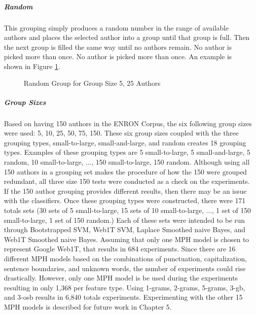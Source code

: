 		\subparagraph{Random} This grouping simply produces a random number in the range of available authors and places the selected author into a group until that group is full.  Then the next group is filled the same way until no authors remain.  No author is picked more than once. No author is picked more than once. An example is shown in Figure \ref{fig:randomGrouping}.
		\begin{figure}[ht!]
			\begin{center}
				\caption{Random Group for Group Size 5, 25 Authors}
				\label{fig:randomGrouping}
			\end{center}
		\end{figure}
		\subparagraph{Group Sizes} Based on having 150 authors in the ENRON Corpus, the six following group sizes were used: 5, 10, 25, 50, 75, 150.  These six group sizes coupled with the three grouping types, small-to-large, small-and-large, and random creates 18 grouping types.  Examples of these grouping types are 5 small-to-large, 5 small-and-large, 5 random, 10 small-to-large, ..., 150 small-to-large, 150 random.  Although using all 150 authors in a grouping set makes the procedure of how the 150 were grouped redundant, all three size 150 tests were conducted as a check on the experiments. If the 150 author grouping provides different results, then there may be an issue with the classifiers. Once these grouping types were constructed, there were 171 totals sets (30 sets of 5 small-to-large, 15 sets of 10 small-to-large, ..., 1 set of 150 small-to-large, 1 set of 150 random.)  Each of these sets were intended to be run through Bootstrapped SVM, Web1T SVM, Laplace Smoothed naive Bayes, and Web1T Smoothed naive Bayes.  Assuming that only one MPH model is chosen to represent Google Web1T, that results in 684 experiments.  Since there are 16 different MPH models based on the combinations of punctuation, capitalization, sentence boundaries, and unknown words, the number of experiments could rise drastically.  However, only one MPH model is be used during the experiments resulting in only 1,368 per feature type.  Using 1-grams, 2-grams, 5-grams, 3-gb, and 3-osb results in 6,840 totals experiments.  Experimenting with the other 15 MPH models is described for future work in Chapter 5.
	
